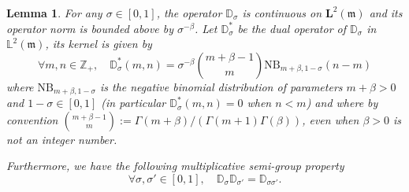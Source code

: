 \documentclass[10pt]{amsart}
\newtheorem{lemm}[theo]{Lemma}\newtheorem{prop}[theo]{Proposition}\newtheorem{coro}[theo]{Corollary}\newtheorem{conj}[theo]{Conjecture}
\theoremstyle{definition}\newtheorem{defi}[theo]{Definition}\newtheorem{rema}[theo]{Remark}\newtheorem{exam}[theo]{Example}\newtheorem{exem}[theo]{Example}\newtheorem{nota}[theo]{Notation}
\newcommand{\df}{\mathrel{:=}}
\newcommand{\LL}{\mathbb{L}}
\newcommand{\ZZ}{\mathbb{Z}}
\newcommand{\fm}{\mathfrak{m}}
\newcommand{\esL}{\mathbf{L}}
\newcommand{\discret}[1]{\mathds{#1}}
\let\oldforall\forall
\renewcommand*{\forall}{\mathrel{\oldforall}}
\begin{document}
\begin{lemm}\label{dualdD}
For any $\sigma\in [0,1]$, the operator $\discret{D}_{\sigma}$ is continuous on $\esL^2(\fm)$ and its operator norm is bounded above by ${\sigma}^{-\beta}$. Let $\discret{D}_{\sigma}^*$ be the dual operator of $\discret{D}_{\sigma}$ in $\LL^2(\fm)$, its kernel is given by
\[
\forall m,n\in\ZZ_+,\quad
\discret{D}_{\sigma}^*(m,n)={\sigma}^{-\beta}\binom{m+\beta-1}{m}\mathrm{NB}_{m+\beta,1-{\sigma}}(n-m)
\]
where $\mathrm{NB}_{m+\beta,1-{\sigma}}$ is the negative binomial distribution of parameters $m+\beta>0$ and $1-{\sigma}\in[0,1]$ (in particular $\discret{D}_{\sigma}^*(m,n)=0$ when $n<m$) and where by convention $\binom{m+\beta-1}{m}\df \Gamma(m+\beta)/(\Gamma(m+1)\Gamma(\beta))$, even when $\beta>0$ is not an integer number.

Furthermore, we have the following multiplicative semi-group property
\[
\forall \sigma,{\sigma}'\in[0,1],\quad \discret{D}_{\sigma}\discret{D}_{{\sigma}'}=\discret{D}_{{\sigma}{\sigma}'}.
\]
\end{lemm}
\end{document}
